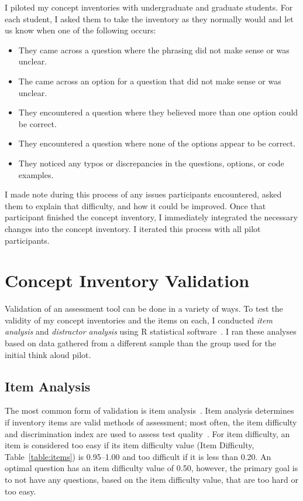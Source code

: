 I piloted my concept inventories with undergraduate and graduate students. For each student, I asked them to take the inventory as they normally would and let us know when one of the following occurs:
	
	\begin{itemize}
		\item They came across a question where the phrasing did not make sense or was unclear.
		\item The came across an option for a question that did not make sense or was unclear.
		\item They encountered a question where they believed more than one option could be correct.
		\item They encountered a question where none of the options appear to be correct.
		\item They noticed any typos or discrepancies in the questions, options, or code examples.
	\end{itemize}
	
I made note during this process of any issues participants encountered, asked them to explain that difficulty, and how it could be improved. Once that participant finished the concept inventory, I immediately integrated the necessary changes into the concept inventory. I iterated this process with all pilot participants.

\section{Concept Inventory Validation}

Validation of an assessment tool can be done in a variety of ways.
To test the validity of my concept inventories and the items on each, I conducted \textit{item analysis} and \textit{distractor analysis} using R statistical software~\cite{boopathiraj2013analysis, RSoftware}. 
I ran these analyses based on data gathered from a different sample than the group used for the initial think aloud pilot. 

\subsection{Item Analysis}
The most common form of validation is item analysis~\cite{gorsuch1997exploratory}.
Item analysis determines if inventory items are valid methods of assessment; most often, the item difficulty and discrimination index are used to assess test quality~\cite{boopathiraj2013analysis}. For item difficulty, an item is considered too easy if its item difficulty value (Item Difficulty, Table~\ref{table:items}) is 0.95--1.00 and too difficult if it is less than 0.20. An optimal question has an item difficulty value of 0.50, however, the primary goal is to not have any questions, based on the item difficulty value, that are too hard or too easy. 

